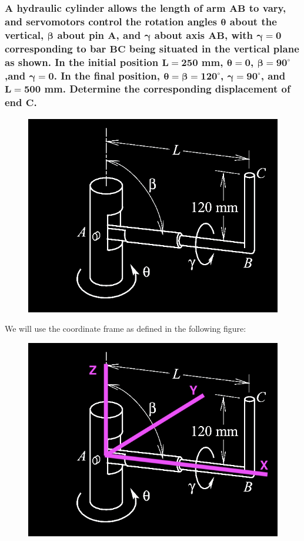\documentclass[12pt, letterpaper]{../assignment}
\begin{document}
\subsubsection*{A hydraulic cylinder allows the length of arm $\bm{AB}$ to vary,
and servomotors control the rotation angles $\bm{\theta}$ about the vertical,
$\bm{\beta}$ about pin $\bm{A}$, and $\bm{\gamma}$ about axis $\bm{AB}$,
with $\bm{\gamma = 0}$ corresponding to bar $\bm{BC}$ being situated in the vertical
plane as shown. In the initial position $\bm{L = 250}$ mm, $\bm{\theta = 0}$,
$\bm{\beta = 90^\circ}$,and $\bm{\gamma = 0}$.
In the final position, $\bm{\theta = \beta = 120^\circ}$, $\bm{\gamma = 90^\circ}$,
and $\bm{L = 500}$ mm. Determine the corresponding displacement of end $\bm{C}$.}

\begin{figure}[H]
    \centering
    \includegraphics[frame]{images/P_3_18.png}
\end{figure}

We will use the coordinate frame as defined in the following figure:

\begin{figure}[H]
    \centering
    \includegraphics[frame]{images/P_3_18_cf.png}
\end{figure}
\end{document}
